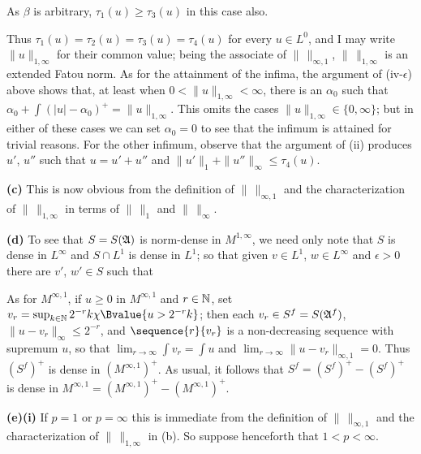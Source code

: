 {
     
\noindent As $\beta$ is arbitrary, $\tau_1(u)\ge\tau_3(u)$ in this case
also.\ \Qed
     
\medskip
     
 Thus $\tau_1(u)=\tau_2(u)=\tau_3(u)=\tau_4(u)$ for every
$u\in L^0$, and I may write $\|u\|_{1,\infty}$ for their common value;
being the associate of $\|\,\|_{\infty,1}$, $\|\,\|_{1,\infty}$ is an
extended Fatou norm.   As for the attainment of the infima, the argument
of (iv-$\epsilon$) above shows that, at least when
$0<\|u\|_{1,\infty}<\infty$, there is an $\alpha_0$ such that
$\alpha_0+\int(|u|-\alpha_0)^+=\|u\|_{1,\infty}$.   This omits the cases
$\|u\|_{1,\infty}\in\{0,\infty\}$;  but in either of these cases we can
set $\alpha_0=0$ to see that the infimum is attained for trivial
reasons.
For the other infimum, observe that the argument of (ii) produces $u'$,
$u''$ such that $u=u'+u''$ and $\|u'\|_1+\|u''\|_{\infty}\le\tau_4(u)$.
     
\medskip
     
{\bf (c)} This is now obvious from the definition of $\|\,\|_{\infty,1}$
and the characterization of $\|\,\|_{1,\infty}$ in terms of $\|\,\|_1$
and $\|\,\|_{\infty}$.
     
\medskip
     
{\bf (d)} To see that $S=S(\frak A)$ is norm-dense in $M^{1,\infty}$, we
need only note that $S$ is dense in $L^{\infty}$ and $S\cap L^1$ is
dense in $L^1$;  so that given $v\in L^1$, $w\in L^{\infty}$ and
$\epsilon>0$ there are $v'$, $w'\in S$ such that
     
     
\noindent As for $M^{\infty,1}$, if $u\ge 0$ in $M^{\infty,1}$ and
$r\in\Bbb N$, set $v_r=\sup_{k\in\Bbb
N}2^{-r}k\chi\Bvalue{u>2^{-r}k}$;
then each $v_r\in S^f=S(\frak A^f)$,
$\|u-v_r\|_{\infty}\le 2^{-r}$, and $\sequence{r}{v_r}$ is a
non-decreasing sequence with supremum $u$, so that
$\lim_{r\to\infty}\int v_r=\int u$ and
$\lim_{r\to\infty}\|u-v_r\|_{\infty,1}=0$.   Thus $(S^f)^+$ is dense in
$(M^{\infty,1})^+$.   As usual, it follows that $S^f=(S^f)^+-(S^f)^+$ is
dense in $M^{\infty,1}=(M^{\infty,1})^+-(M^{\infty,1})^+$.
     
\medskip
     
{\bf (e)(i)} If $p=1$ or $p=\infty$ this is immediate from the
definition
of $\|\,\|_{\infty,1}$ and the characterization of $\|\,\|_{1,\infty}$
in
(b).   So suppose henceforth that $1<p<\infty$.
     
}
